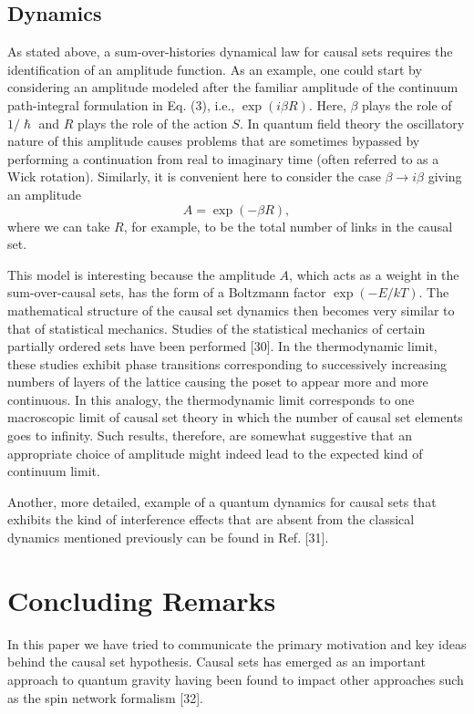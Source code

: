 \subsection{Dynamics}

As stated above, a sum-over-histories dynamical law for causal sets requires
the identification of an amplitude function. As an example, one could start
by considering an amplitude modeled after the familiar amplitude of the
continuum path-integral formulation in Eq. (3), i.e., $\exp (i\beta R)$.
Here, $\beta $ plays the role of $1/\hslash $ and $R$ plays the role of the
action $S$. In quantum field theory the oscillatory nature of this amplitude
causes problems that are sometimes bypassed by performing a continuation
from real to imaginary time (often referred to as a Wick rotation).
Similarly, it is convenient here to consider the case $\beta \rightarrow
i\beta $ giving an amplitude 
\begin{equation}
A=\exp (-\beta R),  \label{5}
\end{equation}
where we can take $R$, for example, to be the total number of links in the
causal set.

This model is interesting because the amplitude $A$, which acts as a weight
in the sum-over-causal sets, has the form of a Boltzmann factor $\exp
(-E/kT) $. The mathematical structure of the causal set dynamics then
becomes very similar to that of statistical mechanics. Studies of the
statistical mechanics of certain partially ordered sets have been performed
[30]. In the thermodynamic limit, these studies exhibit phase transitions
corresponding to successively increasing numbers of layers of the lattice
causing the poset to appear more and more continuous. In this analogy, the
thermodynamic limit corresponds to one macroscopic limit of causal set
theory in which the number of causal set elements goes to infinity. Such
results, therefore, are somewhat suggestive that an appropriate choice of
amplitude might indeed lead to the expected kind of continuum limit.

Another, more detailed, example of a quantum dynamics for causal sets that
exhibits the kind of interference effects that are absent from the classical
dynamics mentioned previously can be found in Ref. [31].

\section{Concluding Remarks}

In this paper we have tried to communicate the primary motivation and key
ideas behind the causal set hypothesis. Causal sets has emerged as an
important approach to quantum gravity having been found to impact other
approaches such as the spin network formalism [32].

